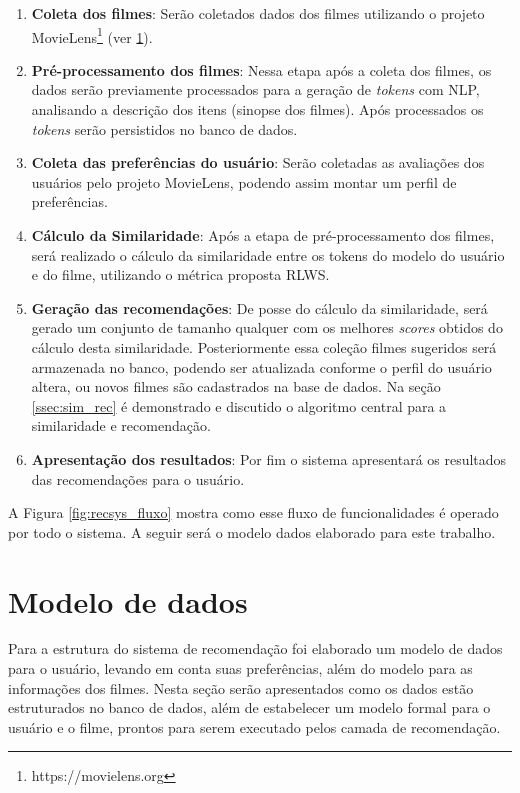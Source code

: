 \begin{enumerate}
	\item{\textbf{Coleta dos filmes}: Serão coletados dados dos filmes utilizando o projeto MovieLens\footnote{https://movielens.org} (ver \ref{sec:dataModel}).}

	\item{\textbf{Pré-processamento dos filmes}: Nessa etapa após a coleta dos filmes, os dados serão previamente processados para a geração de \textit{tokens} com \ac{NLP}, analisando a descrição dos itens (sinopse dos filmes). Após processados os \textit{tokens} serão persistidos no banco de dados.}

	\item{\textbf{Coleta das preferências do usuário}: Serão coletadas as avaliações dos usuários pelo projeto MovieLens, podendo assim montar um perfil de preferências.}

	\item{\textbf{Cálculo da Similaridade}: Após a etapa de pré-processamento dos filmes, será realizado o cálculo da similaridade entre os tokens do modelo do usuário e do filme, utilizando o métrica proposta \ac{RLWS}.}

	\item{\textbf{Geração das recomendações}: De posse do cálculo da similaridade, será gerado um conjunto de tamanho qualquer com os melhores \textit{scores} obtidos do cálculo desta similaridade. Posteriormente essa coleção filmes sugeridos será armazenada no banco, podendo ser atualizada conforme o perfil do usuário altera, ou novos filmes são cadastrados na base de dados. Na seção \ref{ssec:sim_rec} é demonstrado e discutido o algoritmo central para a similaridade e recomendação.}

	\item{\textbf{Apresentação dos resultados}: Por fim o sistema apresentará os resultados das recomendações para o usuário.}
\end{enumerate}

A Figura \ref{fig:recsys_fluxo} mostra como esse fluxo de funcionalidades é operado por todo o sistema. A seguir será o modelo dados elaborado para este trabalho.

\section{Modelo de dados}
\label{sec:dataModel}

Para a estrutura do sistema de recomendação foi elaborado um modelo de dados para o usuário, levando em conta suas preferências, além do modelo para as informações dos filmes. Nesta seção serão apresentados como os dados estão estruturados no banco de dados, além de estabelecer um modelo formal para o usuário e o filme, prontos para serem executado pelos camada de recomendação.

